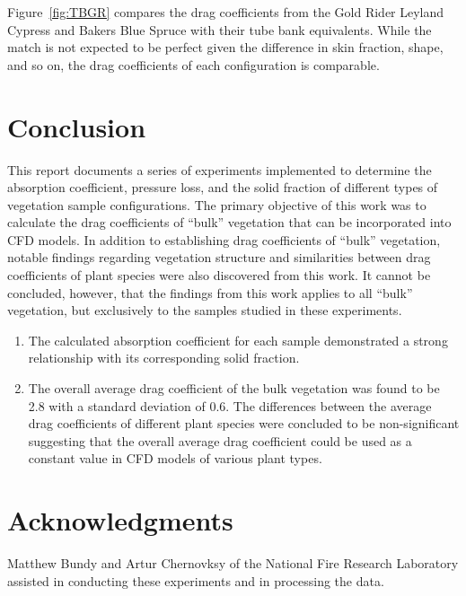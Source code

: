 \documentclass[12pt]{article}
\begin{document}
Figure~\ref{fig:TBGR} compares the drag coefficients from the Gold Rider Leyland Cypress and Bakers Blue Spruce with their tube bank equivalents. While the match is not expected to be perfect given the difference in skin fraction, shape, and so on, the drag coefficients of each configuration is comparable.
\pagebreak

\section{Conclusion}

This report documents a series of experiments implemented to determine the absorption coefficient, pressure loss, and the solid fraction of different types of vegetation sample configurations. The primary objective of this work was to calculate the drag coefficients of ``bulk'' vegetation that can be incorporated into CFD models. In addition to establishing drag coefficients of ``bulk''  vegetation, notable findings regarding vegetation structure and similarities between drag coefficients of plant species were also discovered from this work. It cannot be concluded, however, that the findings from this work applies to all ``bulk'' vegetation, but exclusively to the samples studied in these experiments.

\begin{enumerate}
  \item The calculated absorption coefficient for each sample demonstrated a strong relationship with its corresponding solid fraction.
  \item The overall average drag coefficient of the bulk vegetation was found to be 2.8 with a standard deviation of 0.6. The differences between the average drag coefficients of different plant species were concluded to be non-significant suggesting that the overall average drag coefficient could be used as a constant value in CFD models of various plant types.
\end{enumerate}

\section*{Acknowledgments}

\noindent Matthew Bundy and Artur Chernovksy of the National Fire Research Laboratory assisted in conducting these experiments and in processing the data.   \\
\pagebreak
\end{document}

